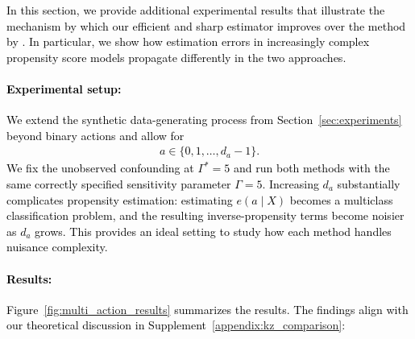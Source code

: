 \documentclass{article} %
\theoremstyle{plain}
\theoremstyle{definition}
\theoremstyle{remark}
\newcommand{\rebuttal}[1]{\textcolor{black}{#1}}
\begin{document}
\rebuttal{In this section, we provide additional experimental results that illustrate the mechanism by which our efficient and sharp estimator improves over the method by \citet{Kallus.2018c,Kallus.2021d}. In particular, we show how estimation
errors in increasingly complex propensity score models propagate differently in the two approaches.}

\paragraph{\rebuttal{Experimental setup:}}
\rebuttal{We extend the synthetic data-generating process from Section~\ref{sec:experiments} beyond binary actions and allow for
\begin{align}
a \in \{0,1,\dots, d_a - 1\}.
\end{align}
We fix the unobserved confounding at $\Gamma^* = 5$ and run both methods with the same correctly specified sensitivity parameter $\Gamma = 5$.
Increasing $d_a$ substantially complicates propensity estimation: estimating $e(a \mid X)$ becomes a multiclass classification problem, and the resulting inverse-propensity terms become noisier as $d_a$ grows. This provides an ideal setting to study how each method handles nuisance complexity.}


\paragraph{\rebuttal{Results:}}
\rebuttal{Figure~\ref{fig:multi_action_results} summarizes the results. The findings align with our theoretical discussion in Supplement~\ref{appendix:kz_comparison}:}
\end{document}
